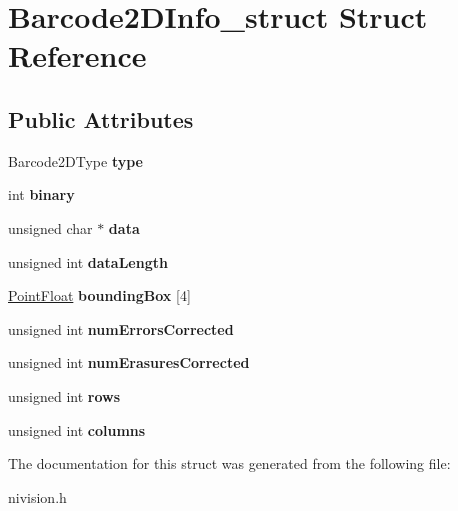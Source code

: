 \hypertarget{structBarcode2DInfo__struct}{\section{\-Barcode2\-D\-Info\-\_\-struct \-Struct \-Reference}
\label{structBarcode2DInfo__struct}
}
\subsection*{\-Public \-Attributes}
\begin{DoxyCompactItemize}
\item 
\hypertarget{structBarcode2DInfo__struct_a01daab14f9ff1ce4c575dfd867e54205}{\-Barcode2\-D\-Type {\bfseries type}}\label{structBarcode2DInfo__struct_a01daab14f9ff1ce4c575dfd867e54205}

\item 
\hypertarget{structBarcode2DInfo__struct_a84123be485339f60f3cd39dc63eea3a3}{int {\bfseries binary}}\label{structBarcode2DInfo__struct_a84123be485339f60f3cd39dc63eea3a3}

\item 
\hypertarget{structBarcode2DInfo__struct_a58bcfdd1694eaa1b72f7ae8abc60de8b}{unsigned char $\ast$ {\bfseries data}}\label{structBarcode2DInfo__struct_a58bcfdd1694eaa1b72f7ae8abc60de8b}

\item 
\hypertarget{structBarcode2DInfo__struct_a788479ecb10e0904a8b160c2c48aa46a}{unsigned int {\bfseries data\-Length}}\label{structBarcode2DInfo__struct_a788479ecb10e0904a8b160c2c48aa46a}

\item 
\hypertarget{structBarcode2DInfo__struct_a29ee1c1dd6570af71deae145a4ce7855}{\hyperlink{structPointFloat__struct}{\-Point\-Float} {\bfseries bounding\-Box} \mbox{[}4\mbox{]}}\label{structBarcode2DInfo__struct_a29ee1c1dd6570af71deae145a4ce7855}

\item 
\hypertarget{structBarcode2DInfo__struct_aec3da9c46310f2498beebb79f9e0900f}{unsigned int {\bfseries num\-Errors\-Corrected}}\label{structBarcode2DInfo__struct_aec3da9c46310f2498beebb79f9e0900f}

\item 
\hypertarget{structBarcode2DInfo__struct_abb4031a1e719dd7c29c2a8c2027698a7}{unsigned int {\bfseries num\-Erasures\-Corrected}}\label{structBarcode2DInfo__struct_abb4031a1e719dd7c29c2a8c2027698a7}

\item 
\hypertarget{structBarcode2DInfo__struct_aef3fe4394b9bd6a43408a7f694fd42d2}{unsigned int {\bfseries rows}}\label{structBarcode2DInfo__struct_aef3fe4394b9bd6a43408a7f694fd42d2}

\item 
\hypertarget{structBarcode2DInfo__struct_a49ceb122774dfa88411d277a72815361}{unsigned int {\bfseries columns}}\label{structBarcode2DInfo__struct_a49ceb122774dfa88411d277a72815361}

\end{DoxyCompactItemize}


\-The documentation for this struct was generated from the following file\-:\begin{DoxyCompactItemize}
\item 
nivision.\-h\end{DoxyCompactItemize}
